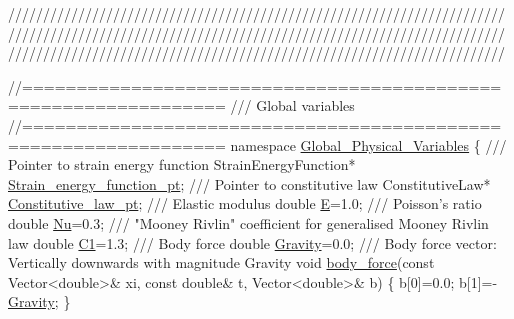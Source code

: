 \begin{DoxyCodeInclude}
\textcolor{comment}{}
\textcolor{comment}{///////////////////////////////////////////////////////////////////////}
\textcolor{comment}{///////////////////////////////////////////////////////////////////////}
\textcolor{comment}{///////////////////////////////////////////////////////////////////////}
\textcolor{comment}{}



\textcolor{comment}{//================================================================}\textcolor{comment}{}
\textcolor{comment}{/// Global variables}
\textcolor{comment}{}\textcolor{comment}{//================================================================}
\textcolor{keyword}{namespace }\hyperlink{namespaceGlobal__Physical__Variables}{Global\_Physical\_Variables}
\{\textcolor{comment}{}
\textcolor{comment}{ /// Pointer to strain energy function}
\textcolor{comment}{} StrainEnergyFunction* \hyperlink{namespaceGlobal__Physical__Variables_af6838abf46c7850f1ee0b3452d6d2498}{Strain\_energy\_function\_pt};
\textcolor{comment}{}
\textcolor{comment}{ /// Pointer to constitutive law}
\textcolor{comment}{} ConstitutiveLaw* \hyperlink{namespaceGlobal__Physical__Variables_a5d5f19442938130d36ee7476ae25049c}{Constitutive\_law\_pt};
\textcolor{comment}{}
\textcolor{comment}{ /// Elastic modulus}
\textcolor{comment}{} \textcolor{keywordtype}{double} \hyperlink{namespaceGlobal__Physical__Variables_a09a019474b7405b35da2437f7779bc7e}{E}=1.0;
\textcolor{comment}{}
\textcolor{comment}{ /// Poisson's ratio}
\textcolor{comment}{} \textcolor{keywordtype}{double} \hyperlink{namespaceGlobal__Physical__Variables_a3962c36313826b19f216f6bbbdd6a477}{Nu}=0.3;
\textcolor{comment}{}
\textcolor{comment}{ /// "Mooney Rivlin" coefficient for generalised Mooney Rivlin law}
\textcolor{comment}{} \textcolor{keywordtype}{double} \hyperlink{namespaceGlobal__Physical__Variables_a849754fa7155c1a31481674ce4845658}{C1}=1.3;
\textcolor{comment}{}
\textcolor{comment}{ /// Body force}
\textcolor{comment}{} \textcolor{keywordtype}{double} \hyperlink{namespaceGlobal__Physical__Variables_a8b80d3e8d63b8d0a0ed435a2dd7fe2ad}{Gravity}=0.0;
\textcolor{comment}{}
\textcolor{comment}{ /// Body force vector: Vertically downwards with magnitude Gravity}
\textcolor{comment}{} \textcolor{keywordtype}{void} \hyperlink{namespaceGlobal__Physical__Variables_a055c27a8d2375f73e74970a8ea1dee21}{body\_force}(\textcolor{keyword}{const} Vector<double>& xi,
                 \textcolor{keyword}{const} \textcolor{keywordtype}{double}& t,
                 Vector<double>& b)
 \{
  b[0]=0.0;
  b[1]=-\hyperlink{namespaceGlobal__Physical__Variables_a8b80d3e8d63b8d0a0ed435a2dd7fe2ad}{Gravity};
 \}


\end{DoxyCodeInclude}
